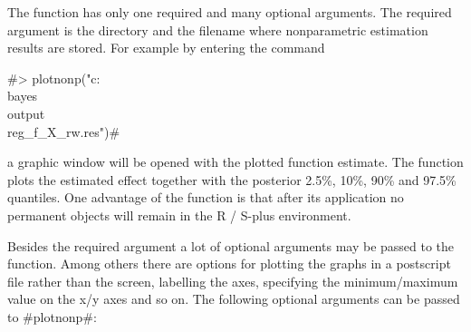 The function has only one required and many optional arguments.
The required argument is the directory and the filename where
nonparametric estimation results are stored. For example by
entering the command

#> plotnonp("c:\\bayes\\output\\reg_f_X_rw.res")#

a graphic window will be opened with the plotted function estimate.
The function plots the estimated effect together with the posterior
2.5\%, 10\%, 90\% and 97.5\% quantiles. One advantage of the
function is that after its application no permanent objects will
remain in the R / S-plus environment.

Besides the required argument a lot of optional arguments may be
passed to the function. Among others there are options for
plotting the graphs in a postscript file rather than the screen,
labelling the axes, specifying the minimum/maximum value on the
x/y axes and so on. The following optional arguments can be passed
to #plotnonp#:

